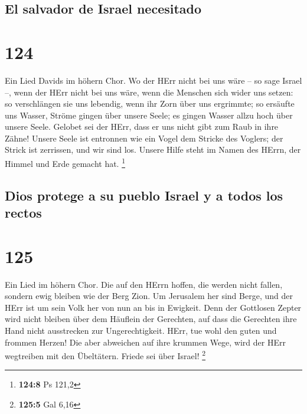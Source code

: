 \hypertarget{el-salvador-de-israel-necesitado}{%
\subsection{El salvador de Israel
necesitado}\label{el-salvador-de-israel-necesitado}}

\hypertarget{section-123}{%
\section{124}\label{section-123}}

 Ein Lied Davids im höhern Chor. Wo der HErr nicht bei uns
wäre -- so sage Israel --,  wenn der HErr nicht bei uns
wäre, wenn die Menschen sich wider uns setzen:  so
verschlängen sie uns lebendig, wenn ihr Zorn über uns ergrimmte;
 so ersäufte uns Wasser, Ströme gingen über unsere Seele;
 es gingen Wasser allzu hoch über unsere Seele.
 Gelobet sei der HErr, dass er uns nicht gibt zum Raub in
ihre Zähne!  Unsere Seele ist entronnen wie ein Vogel dem
Stricke des Voglers; der Strick ist zerrissen, und wir sind los.
 Unsere Hilfe steht im Namen des HErrn, der Himmel und
Erde gemacht hat. \footnote{\textbf{124:8} Ps 121,2}

\hypertarget{dios-protege-a-su-pueblo-israel-y-a-todos-los-rectos}{%
\subsection{Dios protege a su pueblo Israel y a todos los
rectos}\label{dios-protege-a-su-pueblo-israel-y-a-todos-los-rectos}}

\hypertarget{section-124}{%
\section{125}\label{section-124}}

 Ein Lied im höhern Chor. Die auf den HErrn hoffen, die
werden nicht fallen, sondern ewig bleiben wie der Berg Zion.
 Um Jerusalem her sind Berge, und der HErr ist um sein
Volk her von nun an bis in Ewigkeit.  Denn der Gottlosen
Zepter wird nicht bleiben über dem Häuflein der Gerechten, auf dass die
Gerechten ihre Hand nicht ausstrecken zur Ungerechtigkeit.
 HErr, tue wohl den guten und frommen Herzen!
 Die aber abweichen auf ihre krummen Wege, wird der HErr
wegtreiben mit den Übeltätern. Friede sei über Israel! \footnote{\textbf{125:5}
  Gal 6,16}

